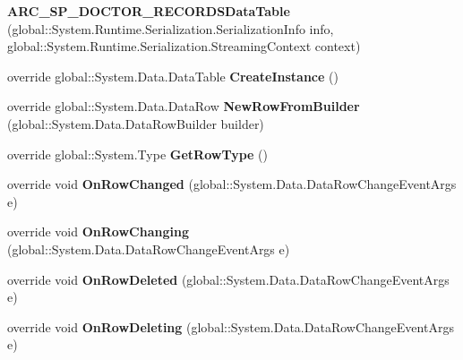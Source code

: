 \begin{CompactItemize}
\item 
\textbf{ARC\_\-SP\_\-DOCTOR\_\-RECORDSDataTable} (global::System.Runtime.Serialization.SerializationInfo info, global::System.Runtime.Serialization.StreamingContext context)\label{class_automatic_medical_system_1_1_data_set1_1_1_a_r_c___s_p___d_o_c_t_o_r___r_e_c_o_r_d_s_data_table_ff64c6d613e34c5ee98bd5fca8ce7dba}

\item 
override global::System.Data.DataTable \textbf{CreateInstance} ()\label{class_automatic_medical_system_1_1_data_set1_1_1_a_r_c___s_p___d_o_c_t_o_r___r_e_c_o_r_d_s_data_table_ff286effbf91dc9b933e7ca6b44aaf50}

\item 
override global::System.Data.DataRow \textbf{NewRowFromBuilder} (global::System.Data.DataRowBuilder builder)\label{class_automatic_medical_system_1_1_data_set1_1_1_a_r_c___s_p___d_o_c_t_o_r___r_e_c_o_r_d_s_data_table_f33d87d9db2b598686400d09aeca8885}

\item 
override global::System.Type \textbf{GetRowType} ()\label{class_automatic_medical_system_1_1_data_set1_1_1_a_r_c___s_p___d_o_c_t_o_r___r_e_c_o_r_d_s_data_table_e53c3ea246912ebf63bfeac16da68a80}

\item 
override void \textbf{OnRowChanged} (global::System.Data.DataRowChangeEventArgs e)\label{class_automatic_medical_system_1_1_data_set1_1_1_a_r_c___s_p___d_o_c_t_o_r___r_e_c_o_r_d_s_data_table_0ab1f2ebd08c9c9e05a53f9fba5258fa}

\item 
override void \textbf{OnRowChanging} (global::System.Data.DataRowChangeEventArgs e)\label{class_automatic_medical_system_1_1_data_set1_1_1_a_r_c___s_p___d_o_c_t_o_r___r_e_c_o_r_d_s_data_table_5c3289ad2560090a3f74d2e6521563cf}

\item 
override void \textbf{OnRowDeleted} (global::System.Data.DataRowChangeEventArgs e)\label{class_automatic_medical_system_1_1_data_set1_1_1_a_r_c___s_p___d_o_c_t_o_r___r_e_c_o_r_d_s_data_table_7282789128cb670b913f0173dfdca942}

\item 
override void \textbf{OnRowDeleting} (global::System.Data.DataRowChangeEventArgs e)\label{class_automatic_medical_system_1_1_data_set1_1_1_a_r_c___s_p___d_o_c_t_o_r___r_e_c_o_r_d_s_data_table_2704d99a348555e319ed95c8714026cc}

\end{CompactItemize}
